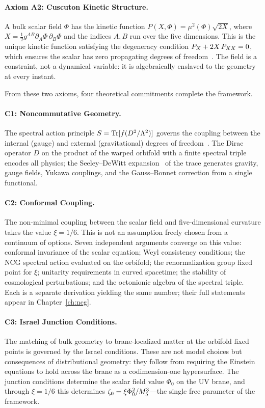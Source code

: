 \paragraph{Axiom A2: Cuscuton Kinetic Structure.}
A bulk scalar field $\Phi$ has the kinetic function
$P(X, \Phi) = \mu^2(\Phi)\sqrt{2X}$, where
$X = \tfrac{1}{2} g^{AB} \partial_A \Phi\, \partial_B \Phi$ and the
indices $A, B$ run over the five dimensions. This is the unique
kinetic function satisfying the degeneracy condition
$P_X + 2X\,P_{XX} = 0$, which ensures the scalar has zero propagating
degrees of freedom~\cite{ch1:afshordi07,ch1:iyonaga18}. The field is a
constraint, not a dynamical variable: it is algebraically enslaved to
the geometry at every instant.

From these two axioms, four theoretical commitments complete the
framework.

\paragraph{C1: Noncommutative Geometry.}
The spectral action principle $S = \operatorname{Tr}[f(D^2/\Lambda^2)]$ governs the
coupling between the internal (gauge) and external (gravitational)
degrees of freedom~\cite{ch1:chamseddine97,ch1:connes94}. The Dirac
operator $D$ on the product of the warped orbifold with a finite
spectral triple encodes all physics; the Seeley--DeWitt
expansion~\cite{ch1:gilkey75} of the trace generates gravity, gauge
fields, Yukawa couplings, and the Gauss--Bonnet correction from a
single functional.

\paragraph{C2: Conformal Coupling.}
The non-minimal coupling between the scalar field and five-dimensional
curvature takes the value $\xi = 1/6$. This is not an assumption freely
chosen from a continuum of options. Seven independent arguments
converge on this value: conformal invariance of the scalar equation;
Weyl consistency conditions; the NCG spectral action evaluated on the
orbifold; the renormalization group fixed point for $\xi$; unitarity
requirements in curved spacetime; the stability of cosmological
perturbations; and the octonionic algebra of the spectral triple. Each
is a separate derivation yielding the same number; their full
statements appear in Chapter~\ref{ch:ncg}.

\paragraph{C3: Israel Junction Conditions.}
The matching of bulk geometry to brane-localized matter at the orbifold
fixed points is governed by the Israel conditions. These are not model
choices but consequences of distributional geometry: they follow from
requiring the Einstein equations to hold across the brane as a
codimension-one hypersurface. The junction conditions determine the
scalar field value $\Phi_0$ on the UV brane, and through $\xi = 1/6$
this determines $\zeta_0 = \xi \Phi_0^2 / M_5^3$---the single free
parameter of the framework.

